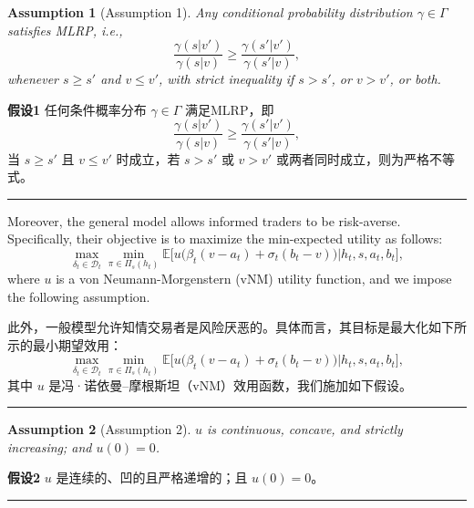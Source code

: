 \documentclass[12pt,a4paper]{article}
\newenvironment{original}{%
  \par\vspace{4pt}\noindent%
  \color{black}%
  \ignorespaces
}{%
  \par\vspace{2pt}%
}
\newenvironment{translation}{%
  \par\vspace{2pt}\noindent%
  \color{transblue}%
  \ignorespaces
}{%
  \par\vspace{4pt}\hrule\vspace{6pt}%
}
\newtheorem{assumption}{Assumption}
\begin{document}
\begin{assumption}[Assumption 1]
Any conditional probability distribution $\gamma \in \Gamma$ satisfies MLRP, i.e.,
\[
\frac{\gamma(s|v')}{\gamma(s|v)} \geq \frac{\gamma(s'|v')}{\gamma(s'|v)},
\]
whenever $s \geq s'$ and $v \leq v'$, with strict inequality if $s > s'$, or $v > v'$, or both.
\end{assumption}
\begin{translation}
\textbf{假设1} 任何条件概率分布 $\gamma \in \Gamma$ 满足MLRP，即
\[
\frac{\gamma(s|v')}{\gamma(s|v)} \geq \frac{\gamma(s'|v')}{\gamma(s'|v)},
\]
当 $s \geq s'$ 且 $v \leq v'$ 时成立，若 $s > s'$ 或 $v > v'$ 或两者同时成立，则为严格不等式。
\end{translation}

\begin{original}
Moreover, the general model allows informed traders to be risk-averse. Specifically, their objective is to maximize the min-expected utility as follows:
\begin{equation}
\max_{\delta_t \in \mathcal{D}_t} \min_{\pi \in \Pi_s(h_t)} \mathbb{E}\big[ u\big( \beta_t(v - a_t) + \sigma_t(b_t - v) \big) \big| h_t, s, a_t, b_t \big], \tag{3.1}
\end{equation}
where $u$ is a von Neumann-Morgenstern (vNM) utility function, and we impose the following assumption.
\end{original}
\begin{translation}
此外，一般模型允许知情交易者是风险厌恶的。具体而言，其目标是最大化如下所示的最小期望效用：
\begin{equation}
\max_{\delta_t \in \mathcal{D}_t} \min_{\pi \in \Pi_s(h_t)} \mathbb{E}\big[ u\big( \beta_t(v - a_t) + \sigma_t(b_t - v) \big) \big| h_t, s, a_t, b_t \big], \tag{3.1}
\end{equation}
其中 $u$ 是冯·诺依曼--摩根斯坦（vNM）效用函数，我们施加如下假设。
\end{translation}

\begin{assumption}[Assumption 2]
$u$ is continuous, concave, and strictly increasing; and $u(0) = 0$.
\end{assumption}
\begin{translation}
\textbf{假设2} $u$ 是连续的、凹的且严格递增的；且 $u(0) = 0$。
\end{translation}
\end{document}
